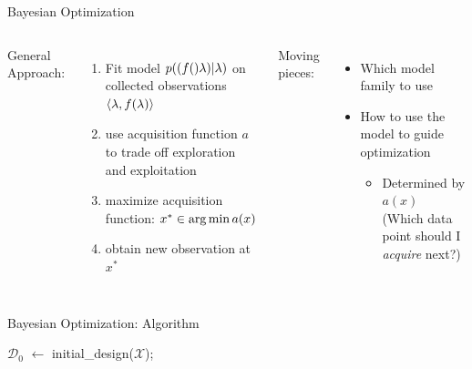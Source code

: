 \begin{frame}[c,fragile]{Bayesian Optimization }
\begin{columns}
General Approach:
\begin{enumerate}
  \item Fit model $p((f()\mathbf{\lambda}) | \mathbf{\lambda})$ on collected observations $\langle{}\mathbf{\lambda}, f(\mathbf{\lambda})\rangle{}$
  \pause
  \item use acquisition function $a$ to trade off exploration and exploitation
  \pause
  \item maximize acquisition function: $x^* \in \operatorname*{arg\,min} a(x)$
  \pause
  \item obtain new observation at $x^*$
\end{enumerate}

\pause
Moving pieces:
\begin{itemize}
  	\item Which \alert{model family} to use 
	\item How to use the model to guide optimization
	\begin{itemize}
		\item Determined by $a(x)$\\
		(Which data point should I \emph{acquire} next?) 
	\end{itemize}
\end{itemize}

\end{columns}

\end{frame}
\begin{frame}[c,fragile]{Bayesian Optimization: Algorithm}

\begin{algorithm}[H]
	\BlankLine
	$\mathcal{D}_0$ $\leftarrow$ initial\_design($\mathcal{X}$); \\
	\For{n = $1, 2, \ldots m - |D_0|$}{
		$\surro: \conf \mapsto f(\lambda)$ $\leftarrow$ fit predictive model on $\mathcal{D}_{n-1}$;\\
		select $x_{n}$ by optimizing $x_{n} \in \argmax_{x \in \mathcal{X}} \alpha(x; \mathcal{D}_{n-1}, \surro)$;\\
		Query $y_{n} := f(x_{n})$;\\
		Add observation to data $D_{n} := D_{n-1} \cup \{\langle x_{n}, y_{n} \rangle \}$;\\
	}
	\caption{Bayesian Optimization (BO)}
\end{algorithm}


\end{frame}
